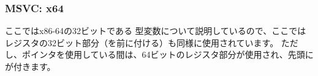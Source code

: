 \subsubsection{MSVC: x64}


ここではx86-64の32ビットである \Tint 型変数について説明しているので、ここではレジスタの32ビット部分（を前に付ける）も同様に使用されています。 
ただし、ポインタを使用している間は、64ビットのレジスタ部分が使用され、先頭にが付きます。



